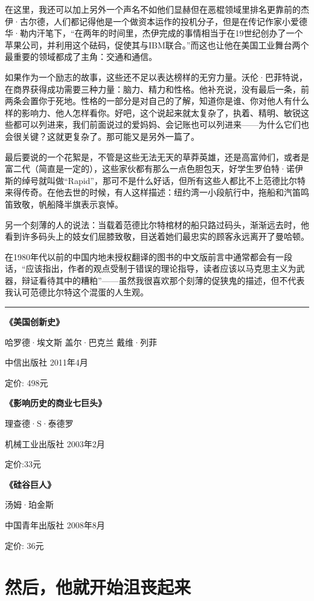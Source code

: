 在这里，我还可以加上另外一个声名不如他们显赫但在恶棍领域里排名更靠前的杰伊·古尔德，人们都记得他是一个做资本运作的投机分子，但是在传记作家小爱德华·勒内汗笔下，``在两年的时间里，杰伊完成的事情相当于在19世纪创办了一个苹果公司，并利用这个砝码，促使其与IBM联合。''而这也让他在美国工业舞台两个最重要的领域都成了主角：交通和通信。

如果作为一个励志的故事，这些还不足以表达榜样的无穷力量。沃伦·巴菲特说，在商界获得成功需要三种力量：脑力、精力和性格。他补充说，没有最后一条，前两条会置你于死地。性格的一部分是对自己的了解，知道你是谁、你对他人有什么样的影响力、他人怎样看你。好吧，这个说起来就太复杂了，执着、精明、敏锐这些都可以列进来，我们前面说过的爱妈妈、会记账也可以列进来------为什么它们也会很关键？这就更复杂了。那可能又是另外一篇了。

最后要说的一个花絮是，不管是这些无法无天的草莽英雄，还是高富帅们，或者是富二代（简直是一定的），这些家伙都有那么一点色胆包天，好学生罗伯特·诺伊斯的绰号就叫做``Rapid''，那可不是什么好话，但所有这些人都比不上范德比尔特来得传奇。在他去世的时候，有人这样描述：纽约湾一小段航行中，拖船和汽笛鸣笛致敬，帆船降半旗表示哀悼。

另一个刻薄的人的说法：当载着范德比尔特棺材的船只路过码头，渐渐远去时，他看到许多码头上的妓女们屈膝致敬，目送着她们最忠实的顾客永远离开了曼哈顿。

在1980年代以前的中国内地未授权翻译的图书的中文版前言中通常都会有一段话，``应该指出，作者的观点受制于错误的理论指导，读者应该以马克思主义为武器，辩证看待其中的糟粕''------虽然我很喜欢那个刻薄的促狭鬼的描述，但不代表我认可范德比尔特这个混蛋的人生观。

\begin{center}\rule{0.5\linewidth}{0.5pt}\end{center}

\textbf{《美国创新史》}

哈罗德·埃文斯 盖尔·巴克兰 戴维·列菲

中信出版社 2011年4月

定价: 498元

\textbf{《影响历史的商业七巨头》}

理查德·S·泰德罗

机械工业出版社 2003年2月

定价:33元

\textbf{《硅谷巨人》}

汤姆·珀金斯

中国青年出版社 2008年8月

定价: 36元

\hypertarget{ux7136ux540eux4ed6ux5c31ux5f00ux59cbux6caeux4e27ux8d77ux6765}{%
\section{然后，他就开始沮丧起来}\label{ux7136ux540eux4ed6ux5c31ux5f00ux59cbux6caeux4e27ux8d77ux6765}}

